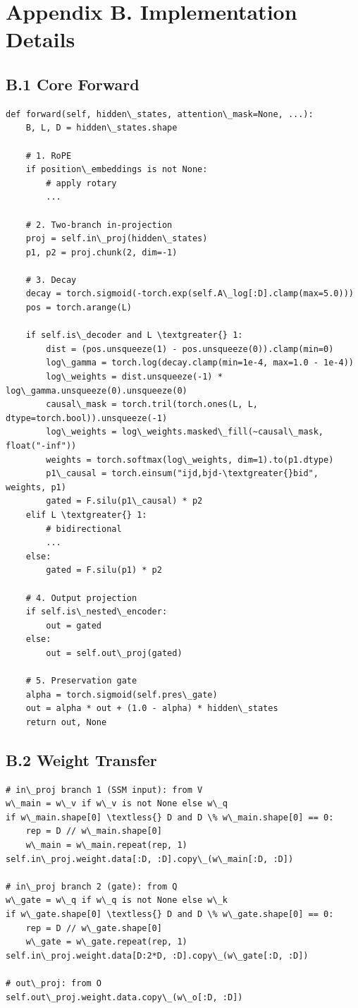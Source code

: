 \section{Appendix B. Implementation Details}

\subsection{B.1 Core Forward}

\begin{lstlisting}
def forward(self, hidden\_states, attention\_mask=None, ...):
    B, L, D = hidden\_states.shape
    
    # 1. RoPE
    if position\_embeddings is not None:
        # apply rotary
        ...
    
    # 2. Two-branch in-projection
    proj = self.in\_proj(hidden\_states)
    p1, p2 = proj.chunk(2, dim=-1)
    
    # 3. Decay
    decay = torch.sigmoid(-torch.exp(self.A\_log[:D].clamp(max=5.0)))
    pos = torch.arange(L)
    
    if self.is\_decoder and L \textgreater{} 1:
        dist = (pos.unsqueeze(1) - pos.unsqueeze(0)).clamp(min=0)
        log\_gamma = torch.log(decay.clamp(min=1e-4, max=1.0 - 1e-4))
        log\_weights = dist.unsqueeze(-1) * log\_gamma.unsqueeze(0).unsqueeze(0)
        causal\_mask = torch.tril(torch.ones(L, L, dtype=torch.bool)).unsqueeze(-1)
        log\_weights = log\_weights.masked\_fill(~causal\_mask, float("-inf"))
        weights = torch.softmax(log\_weights, dim=1).to(p1.dtype)
        p1\_causal = torch.einsum("ijd,bjd-\textgreater{}bid", weights, p1)
        gated = F.silu(p1\_causal) * p2
    elif L \textgreater{} 1:
        # bidirectional
        ...
    else:
        gated = F.silu(p1) * p2
    
    # 4. Output projection
    if self.is\_nested\_encoder:
        out = gated
    else:
        out = self.out\_proj(gated)
    
    # 5. Preservation gate
    alpha = torch.sigmoid(self.pres\_gate)
    out = alpha * out + (1.0 - alpha) * hidden\_states
    return out, None
\end{lstlisting}

\subsection{B.2 Weight Transfer}

\begin{lstlisting}
# in\_proj branch 1 (SSM input): from V
w\_main = w\_v if w\_v is not None else w\_q
if w\_main.shape[0] \textless{} D and D \% w\_main.shape[0] == 0:
    rep = D // w\_main.shape[0]
    w\_main = w\_main.repeat(rep, 1)
self.in\_proj.weight.data[:D, :D].copy\_(w\_main[:D, :D])

# in\_proj branch 2 (gate): from Q
w\_gate = w\_q if w\_q is not None else w\_k
if w\_gate.shape[0] \textless{} D and D \% w\_gate.shape[0] == 0:
    rep = D // w\_gate.shape[0]
    w\_gate = w\_gate.repeat(rep, 1)
self.in\_proj.weight.data[D:2*D, :D].copy\_(w\_gate[:D, :D])

# out\_proj: from O
self.out\_proj.weight.data.copy\_(w\_o[:D, :D])
\end{lstlisting}

